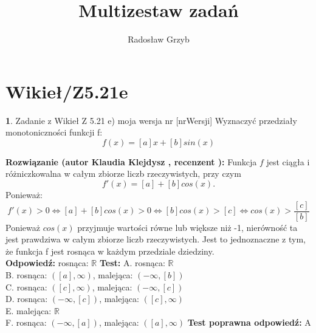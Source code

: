 \documentclass[12pt, a4paper]{article}
\title{Multizestaw zadań}
\author{Radosław Grzyb}
\date{}
\theoremstyle{definition} %
\newtheorem{zad}{}
\newcommand{\kategoria}[1]{\section{#1}} %
\newcommand{\zadStart}[1]{\begin{zad}#1\newline} %
\newcommand{\zadStop}{\end{zad}}   %
\newcommand{\rozwStart}[2]{\noindent \textbf{Rozwiązanie (autor #1 , recenzent #2): }\newline} %
\newcommand{\rozwStop}{\newline}                                            %
\newcommand{\odpStart}{\noindent \textbf{Odpowiedź:}\newline}    %
\newcommand{\odpStop}{\newline}                                             %
\newcommand{\testStart}{\noindent \textbf{Test:}\newline} %
\newcommand{\testStop}{\newline} %
\newcommand{\kluczStart}{\noindent \textbf{Test poprawna odpowiedź:}\newline} %
\newcommand{\kluczStop}{\newline} %
\begin{document}
\maketitle


\kategoria{Wikieł/Z5.21e}
\zadStart{Zadanie z Wikieł Z 5.21 e) moja wersja nr [nrWersji]}
Wyznaczyć przedziały monotoniczności funkcji f:
$$f(x)=[a]x+[b]sin(x)$$
\zadStop
\rozwStart{Klaudia Klejdysz}{}
Funkcja $f$ jest ciągła i różniczkowalna w całym zbiorze liczb rzeczywistych, przy czym
$$f'(x)=[a]+[b]cos(x)\text{.}$$
Ponieważ:
$$f'(x)>0 \Leftrightarrow [a]+[b]cos(x)>0\Leftrightarrow [b]cos(x)>[c]\Leftrightarrow cos(x)>\frac{[c]}{[b]}$$
Ponieważ $cos(x)$ przyjmuje wartości równe lub większe niż -1, nierówność ta jest prawdziwa w całym zbiorze liczb rzeczywistych. Jest to jednoznaczne z tym, że funkcja f jest rosnąca w każdym przedziale dziedziny.
\\
\rozwStop
\odpStart
rosnąca: $\mathbb{R}$
\odpStop
\testStart
A. rosnąca: $\mathbb{R}$\\
B. rosnąca: $([a],\infty)$, malejąca: $(-\infty,[b])$\\
C. rosnąca: $([c],\infty)$, malejąca: $(-\infty,[c])$\\
D. rosnąca: $(-\infty,[c])$, malejąca: $([c],\infty)$\\
E. malejąca: $\mathbb{R}$\\
F. rosnąca: $(-\infty,[a])$, malejąca: $([a],\infty)$
\testStop
\kluczStart
A
\kluczStop
\end{document}
